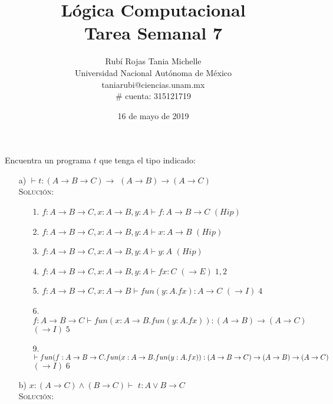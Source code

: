 \documentclass[letterpaper,12pt]{article}
\title{Lógica Computacional \\ Tarea Semanal 7}
\author{Rubí Rojas Tania Michelle \\
        Universidad Nacional Autónoma de México \\
        taniarubi@ciencias.unam.mx \\
        \# cuenta: 315121719}
\date{16 de mayo de 2019}
\begin{document}
\maketitle

Encuentra un programa $t$ que tenga el tipo indicado:

\begin{enumerate}
    \item[a)] $\vdash t: (A \rightarrow B \rightarrow C) \rightarrow$ 
    $(A \rightarrow B) \rightarrow (A \rightarrow C)$ \\
    \textsc{Solución:}
    
    \begin{enumerate}
        \item[1.] $f: A \rightarrow B \rightarrow C, x: A \rightarrow B, y: A
        \vdash f: A \rightarrow B \rightarrow C$ \; \; \; $(Hip)$
        \item[2.] $f: A \rightarrow B \rightarrow C, x: A \rightarrow B, y: A
        \vdash x: A \rightarrow B$ \; \; \;  \; \; \; \; $(Hip)$
        \item[3.] $f: A \rightarrow B \rightarrow C, x: A \rightarrow B, y: A
        \vdash y: A$ \; \; \; \; \; \; \; \; \; \;  \; $(Hip)$ 
        \item[4.] $f: A \rightarrow B \rightarrow C, x: A \rightarrow B, y: A
        \vdash fx: C$ \; \; \; \; \; \; \; \; \; \; $(\rightarrow E) \; 1,2$
        \item[5.] $f: A \rightarrow B \rightarrow C, x: A \rightarrow B
        \vdash fun(y: A.fx) : A \rightarrow C$ \; \; \;$(\rightarrow I) \; 4$
        \item[6.] $f: A \rightarrow B \rightarrow C \vdash fun(x: A \rightarrow B.fun(y: A.fx)) : 
        (A \rightarrow B) \rightarrow (A \rightarrow C)$ \; \; $(\rightarrow I) \; 5$
        \item[9.] $\vdash fun(f: A \rightarrow B \rightarrow C.
        fun(x: A \rightarrow B.fun(y: A.fx)) : \\
        (A \rightarrow B \rightarrow C) \rightarrow (A \rightarrow B) \rightarrow (A \rightarrow C)$ 
        \; \; \; \; \; \; \; \; \; \; \; \; \; $(\rightarrow I) \; 6$ 
    \end{enumerate}

    \item[b)] $x: (A \rightarrow C) \land (B \rightarrow C) \vdash$
    $t: A \lor B \rightarrow C$ \\
    \textsc{Solución:}
    

\end{enumerate}
\end{document}
